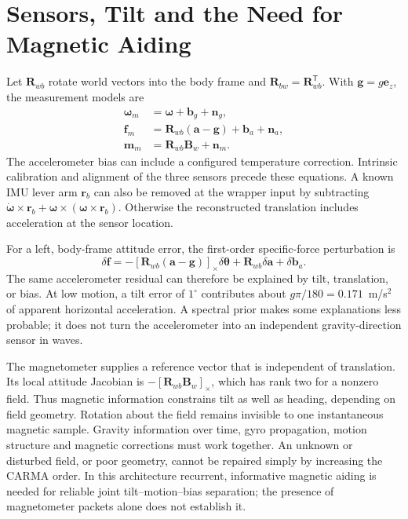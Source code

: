 \documentclass[conference]{IEEEtran}
\newcommand{\vc}[1]{\bm{#1}}
\newcommand{\mt}[1]{\bm{#1}}
\newcommand{\tr}{^{\mathsf T}}
\newcommand{\sk}[1]{[#1]_\times}
\begin{document}
\section{Sensors, Tilt and the Need for Magnetic Aiding}
\label{sec:sensors}
Let $\mt R_{wb}$ rotate world vectors into the body frame and
$\mt R_{bw}=\mt R_{wb}\tr$. With $\vc g=g\vc e_z$, the measurement models are
\begin{align}
 \vc\omega_m&=\vc\omega+\vc b_g+\vc n_g,\label{eq:gyro}\\
 \vc f_m&=\mt R_{wb}(\vc a-\vc g)+\vc b_a+\vc n_a,\label{eq:acc}\\
 \vc m_m&=\mt R_{wb}\vc B_w+\vc n_m.\label{eq:mag}
\end{align}
The accelerometer bias can include a configured temperature correction.
Intrinsic calibration and alignment of the three sensors precede these
equations. A known IMU lever arm $\vc r_b$ can also be removed at the wrapper
input by subtracting
$\dot{\vc\omega}\times\vc r_b+
\vc\omega\times(\vc\omega\times\vc r_b)$.
Otherwise the reconstructed translation includes acceleration at the
sensor location.

For a left, body-frame attitude error, the first-order specific-force
perturbation is
\begin{equation}
 \delta\vc f=-\sk{\mt R_{wb}(\vc a-\vc g)}\delta\vc\theta
              +\mt R_{wb}\delta\vc a+\delta\vc b_a.
 \label{eq:ambiguity}
\end{equation}
The same accelerometer residual can therefore be explained by tilt,
translation, or bias. At low motion, a tilt error of $1^\circ$ contributes
about $g\pi/180=0.171$~m/s$^2$ of apparent horizontal acceleration.
A spectral prior makes some explanations less probable; it does not turn
the accelerometer into an independent gravity-direction sensor in waves.

The magnetometer supplies a reference vector that is independent of
translation. Its local attitude Jacobian is
$-\sk{\mt R_{wb}\vc B_w}$, which has rank two for a nonzero field.
Thus magnetic information constrains tilt as well as heading, depending
on field geometry. Rotation about the field remains invisible to one
instantaneous magnetic sample. Gravity information over time, gyro
propagation, motion structure and magnetic corrections must work together.
An unknown or disturbed field, or poor geometry, cannot be repaired simply
by increasing the CARMA order. In this architecture recurrent, informative
magnetic aiding is needed for reliable joint tilt--motion--bias separation;
the presence of magnetometer packets alone does not establish it.
\end{document}
